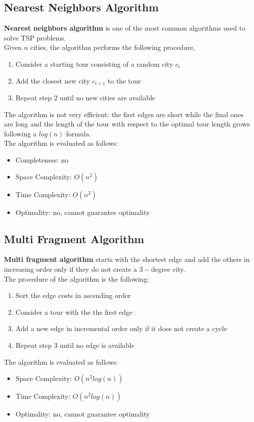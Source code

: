 \documentclass{article}
\begin{document}
\subsection{Nearest Neighbors Algorithm}
\textbf{Nearest neighbors algorithm} is one of the most common algorithms used to solve TSP problems. \\
Given $n$ cities, the algorithm performs the following procedure, 
\begin{enumerate}
    \item Consider a starting tour consisting of a random city $c_i$
    \item Add the closest new city $c_{i+1} $ to the tour
    \item Repeat step $2$ until no new cities are available
\end{enumerate}
The algorithm is not very efficient: the first edges are short while the final ones are long and the length of the tour with respect to the optimal tour length grows following a $log(n)$ formula. \\
The algorithm is evaluated as follows:
\begin{itemize}
    \item Completeness: no
    \item Space Complexity: $O(n^2)$
    \item Time Complexity: $O(n^2)$
    \item Optimality: no, cannot guarantee optimality
\end{itemize}
\newpage
\subsection{Multi Fragment Algorithm}
\textbf{Multi fragment algorithm} starts with the shortest edge and add the others in increasing order only if they do not create a $3-$degree city. \\
The procedure of the algorithm is the following:
\begin{enumerate}
    \item Sort the edge costs in ascending order
    \item Consider a tour with the the first edge
    \item Add a new edge in incremental order only if it does not create a cycle
    \item Repeat step $3$ until no edge is available
\end{enumerate}
The algorithm is evaluated as follows:
\begin{itemize}
    \item Space Complexity: $O(n^2log(n))$
    \item Time Complexity: $O(n^2log(n))$
    \item Optimality: no, cannot guarantee optimality
\end{itemize}
\end{document}
